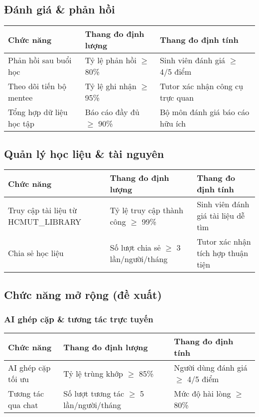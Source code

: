 \vspace{1em}
\subsection{Đánh giá \& phản hồi}
\begin{tabular}{|p{4cm}|p{5cm}|p{4cm}|}
\hline
\textbf{Chức năng} & \textbf{Thang đo định lượng} & \textbf{Thang đo định tính} \\
\hline
Phản hồi sau buổi học & Tỷ lệ phản hồi $\geq$ 80\% & Sinh viên đánh giá $\geq$ 4/5 điểm \\
\hline
Theo dõi tiến bộ mentee & Tỷ lệ ghi nhận $\geq$ 95\% & Tutor xác nhận công cụ trực quan \\
\hline
Tổng hợp dữ liệu học tập & Báo cáo đầy đủ $\geq$ 90\% & Bộ môn đánh giá báo cáo hữu ích \\
\hline
\end{tabular}

\vspace{1em}
\subsection{Quản lý học liệu \& tài nguyên}
\begin{tabular}{|p{4cm}|p{5cm}|p{4cm}|}
\hline
\textbf{Chức năng} & \textbf{Thang đo định lượng} & \textbf{Thang đo định tính} \\
\hline
Truy cập tài liệu từ HCMUT\_LIBRARY & Tỷ lệ truy cập thành công $\geq$ 99\% & Sinh viên đánh giá tài liệu dễ tìm \\
\hline
Chia sẻ học liệu & Số lượt chia sẻ $\geq$ 3 lần/người/tháng & Tutor xác nhận tích hợp thuận tiện \\
\hline
\end{tabular}

\vspace{1em}
\subsection{Chức năng mở rộng (đề xuất)}

\subsubsection*{AI ghép cặp \& tương tác trực tuyến}
\begin{tabular}{|p{4cm}|p{5cm}|p{4cm}|}
\hline
\textbf{Chức năng} & \textbf{Thang đo định lượng} & \textbf{Thang đo định tính} \\
\hline
AI ghép cặp tối ưu & Tỷ lệ trùng khớp $\geq$ 85\% & Người dùng đánh giá $\geq$ 4/5 điểm \\
\hline
Tương tác qua chat & Số lượt tương tác $\geq$ 5 lần/người/tháng & Mức độ hài lòng $\geq$ 80\% \\
\hline
\end{tabular}

